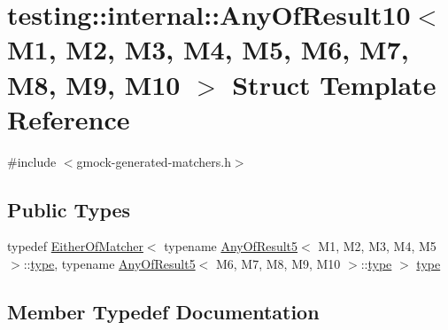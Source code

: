 \hypertarget{structtesting_1_1internal_1_1_any_of_result10}{}\section{testing\+:\+:internal\+:\+:Any\+Of\+Result10$<$ M1, M2, M3, M4, M5, M6, M7, M8, M9, M10 $>$ Struct Template Reference}
\label{structtesting_1_1internal_1_1_any_of_result10}


{\ttfamily \#include $<$gmock-\/generated-\/matchers.\+h$>$}

\subsection*{Public Types}
\begin{DoxyCompactItemize}
\item 
typedef \hyperlink{classtesting_1_1internal_1_1_either_of_matcher}{Either\+Of\+Matcher}$<$ typename \hyperlink{structtesting_1_1internal_1_1_any_of_result5}{Any\+Of\+Result5}$<$ M1, M2, M3, M4, M5 $>$\+::\hyperlink{structtesting_1_1internal_1_1_any_of_result10_aa1cb3d733f29716f2015db8a2b6c1c94}{type}, typename \hyperlink{structtesting_1_1internal_1_1_any_of_result5}{Any\+Of\+Result5}$<$ M6, M7, M8, M9, M10 $>$\+::\hyperlink{structtesting_1_1internal_1_1_any_of_result10_aa1cb3d733f29716f2015db8a2b6c1c94}{type} $>$ \hyperlink{structtesting_1_1internal_1_1_any_of_result10_aa1cb3d733f29716f2015db8a2b6c1c94}{type}
\end{DoxyCompactItemize}


\subsection{Member Typedef Documentation}
\mbox{\label{structtesting_1_1internal_1_1_any_of_result10_aa1cb3d733f29716f2015db8a2b6c1c94}} 
